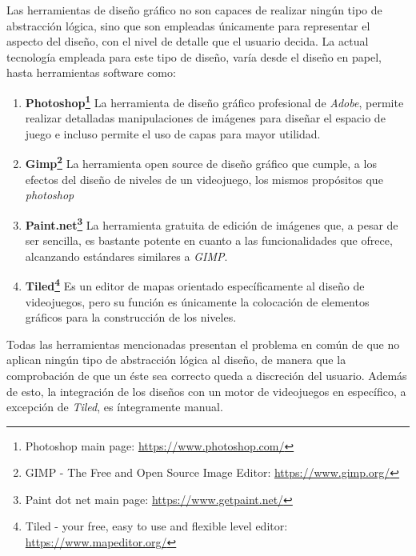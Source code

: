 Las herramientas de diseño gráfico no son capaces de realizar ningún tipo de abstracción lógica, sino que son empleadas únicamente para representar el aspecto del diseño, con el nivel de detalle que el usuario decida.
La actual tecnología empleada para este tipo de diseño, varía desde el diseño en papel, hasta herramientas software como:
\begin{enumerate}
	\item \textbf{Photoshop\footnote{Photoshop main page: \url{https://www.photoshop.com/}}} La herramienta de diseño gráfico profesional de \textit{Adobe}, permite realizar detalladas manipulaciones de imágenes para diseñar el espacio de juego e incluso permite el uso de capas para mayor utilidad.
	\item \textbf{Gimp\footnote{GIMP - The Free and Open Source Image Editor: \url{https://www.gimp.org/}}} La herramienta open source de diseño gráfico que cumple, a los efectos del diseño de niveles de un videojuego, los mismos propósitos que \textit{photoshop}
	\item \textbf{Paint.net\footnote{Paint dot net main page: \url{https://www.getpaint.net/}}} La herramienta gratuita de edición de imágenes que, a pesar de ser sencilla, es bastante potente en cuanto a las funcionalidades que ofrece, alcanzando estándares similares a \textit{GIMP}.
	\item \textbf{Tiled\footnote{Tiled - your free, easy to use and flexible level editor: \url{https://www.mapeditor.org/}}} Es un editor de mapas orientado específicamente al diseño de videojuegos, pero su función es únicamente la colocación de elementos gráficos para la construcción de los niveles.
\end{enumerate}
Todas las herramientas mencionadas presentan el problema en común de que no aplican ningún tipo de abstracción lógica al diseño, de manera que la comprobación de que un éste sea correcto queda a discreción del usuario.
Además de esto, la integración de los diseños con un motor de videojuegos en específico, a excepción de \textit{Tiled}, es íntegramente manual.